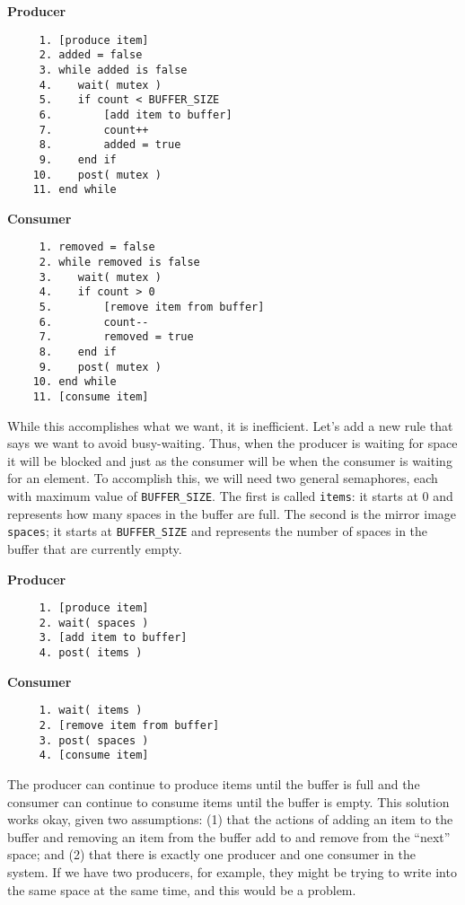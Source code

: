 \begin{multicols}{2}
\textbf{Producer}\vspace{-2em}
  \begin{verbatim}
	 1. [produce item]
	 2. added = false
	 3. while added is false
	 4.    wait( mutex )
	 5.    if count < BUFFER_SIZE
	 6.        [add item to buffer]
	 7.        count++
	 8.        added = true
	 9.    end if
	10.    post( mutex )
	11. end while
  \end{verbatim}
\columnbreak
\textbf{Consumer}\vspace{-2em}
  \begin{verbatim}
	 1. removed = false
	 2. while removed is false
	 3.    wait( mutex )
	 4.    if count > 0
	 5.        [remove item from buffer]
	 6.        count--
	 7.        removed = true
	 8.    end if
	 9.    post( mutex )
	10. end while
	11. [consume item]
  \end{verbatim}
\end{multicols}
\vspace{-2em}


While this accomplishes what we want, it is inefficient. Let's add a new rule that says we want to avoid busy-waiting. Thus, when the producer is waiting for space it will be blocked and just as the consumer will be when the consumer is waiting for an element. To accomplish this, we will need two general semaphores, each with maximum value of \texttt{BUFFER\_SIZE}. The first is called \texttt{items}: it starts at 0 and represents how many spaces in the buffer are full. The second is the mirror image \texttt{spaces}; it starts at \texttt{BUFFER\_SIZE} and represents the number of spaces in the buffer that are currently empty.

\begin{multicols}{2}
\textbf{Producer}\vspace{-2em}
  \begin{verbatim}
	 1. [produce item]
	 2. wait( spaces )
	 3. [add item to buffer]
	 4. post( items )
  \end{verbatim}
\columnbreak
\textbf{Consumer}\vspace{-2em}
  \begin{verbatim}
	 1. wait( items )
	 2. [remove item from buffer]
	 3. post( spaces )
	 4. [consume item]
  \end{verbatim}
\end{multicols}
\vspace{-2em}

The producer can continue to produce items until the buffer is full and the consumer can continue to consume items until the buffer is empty. This solution works okay, given two assumptions: (1) that the actions of adding an item to the buffer and removing an item from the buffer add to and remove from the ``next'' space; and (2) that there is exactly one producer and one consumer in the system. If we have two producers, for example, they might be trying to write into the same space at the same time, and this would be a problem. 

